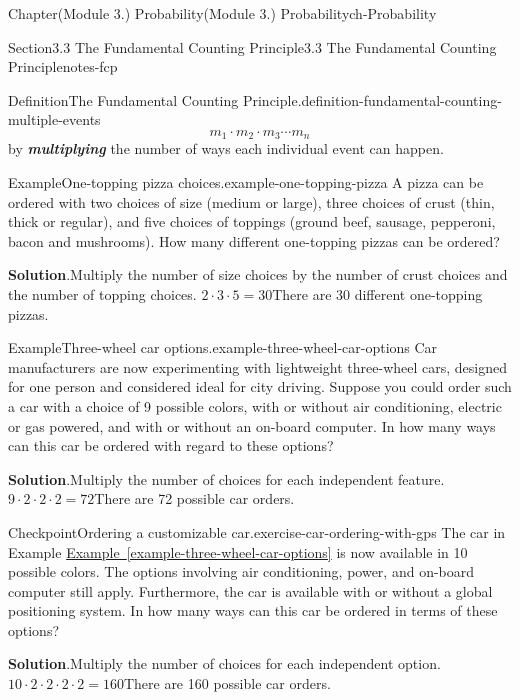 \documentclass[oneside,10pt,]{book}
\newcommand{\blocktitlefont}{\relax}
\newcommand{\xreffont}{\relax}
\newcommand{\alert}[1]{\textbf{\textit{#1}}}
\begin{document}
\begin{chapterptx}{Chapter}{(Module 3.) Probability}{}{(Module 3.) Probability}{}{}{ch-Probability}
\begin{sectionptx}{Section}{3.3 The Fundamental Counting Principle}{}{3.3 The Fundamental Counting Principle}{}{}{notes-fcp}
\begin{definition}{Definition}{The Fundamental Counting Principle.}{definition-fundamental-counting-multiple-events}
\begin{equation*}
m_1 \cdot m_2 \cdot m_3 \cdots m_n
\end{equation*}
by \alert{multiplying} the number of ways each individual event can happen.%
\end{definition}
\begin{example}{Example}{One-topping pizza choices.}{example-one-topping-pizza}%
A pizza can be ordered with two choices of size (medium or large), three choices of crust (thin, thick or regular), and five choices of toppings (ground beef, sausage, pepperoni, bacon and mushrooms). How many different one-topping pizzas can be ordered?%
\par\smallskip%
\noindent\textbf{\blocktitlefont Solution}.\hypertarget{example-one-topping-pizza-3}{}\quad{}Multiply the number of size choices by the number of crust choices and the number of topping choices.%
\(2 \cdot 3 \cdot 5 = 30\)There are 30 different one-topping pizzas.%
\end{example}
\begin{example}{Example}{Three-wheel car options.}{example-three-wheel-car-options}%
Car manufacturers are now experimenting with lightweight three-wheel cars, designed for one person and considered ideal for city driving. Suppose you could order such a car with a choice of 9 possible colors, with or without air conditioning, electric or gas powered, and with or without an on-board computer. In how many ways can this car be ordered with regard to these options?%
\par\smallskip%
\noindent\textbf{\blocktitlefont Solution}.\hypertarget{example-three-wheel-car-options-3}{}\quad{}Multiply the number of choices for each independent feature.%
\(9 \cdot 2 \cdot 2 \cdot 2 = 72\)There are 72 possible car orders.%
\end{example}
\begin{inlineexercise}{Checkpoint}{Ordering a customizable car.}{exercise-car-ordering-with-gps}%
The car in Example \hyperref[example-three-wheel-car-options]{Example~{\xreffont\ref{example-three-wheel-car-options}}} is now available in 10 possible colors. The options involving air conditioning, power, and on-board computer still apply. Furthermore, the car is available with or without a global positioning system. In how many ways can this car be ordered in terms of these options?%
\par\smallskip%
\noindent\textbf{\blocktitlefont Solution}.\hypertarget{exercise-car-ordering-with-gps-3}{}\quad{}Multiply the number of choices for each independent option.%
\(10 \cdot 2 \cdot 2 \cdot 2 \cdot 2 = 160\)There are 160 possible car orders.%

\end{inlineexercise}
\end{sectionptx}
\end{chapterptx}
\end{document}
